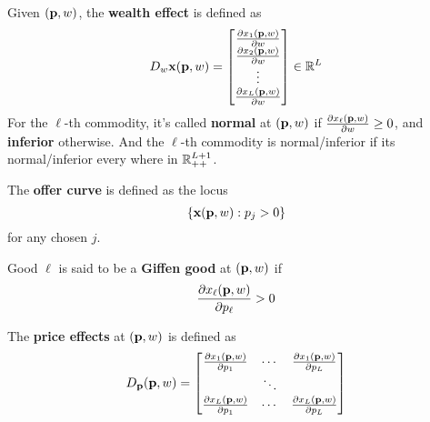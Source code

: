 \documentclass{article}
\begin{document}
 			\begin{definition}
 				Given $(\textbf{p}, w)$, the \textbf{wealth effect} is defined as
 				\begin{equation}
 					D_w \textbf{x}(\textbf{p}, w) 
 					= \begin{bmatrix}
 						\frac{\partial{x_1(\textbf{p}, w)}}{\partial{w}} \\
 						\frac{\partial{x_2(\textbf{p}, w)}}{\partial{w}} \\
 						\vdots \\
 						\frac{\partial{x_L(\textbf{p}, w)}}{\partial{w}}
 					\end{bmatrix} \in \mathbb{R}^L
 				\end{equation}
 				For the $\ell$-th commodity, it's called \textbf{normal} at $(\textbf{p}, w)$ if $\frac{\partial{x_{\ell}(\textbf{p}, w)}}{\partial{w}} \geq 0$, and \textbf{inferior} otherwise. And the $\ell$-th commodity is normal/inferior if its normal/inferior every where in $\mathbb{R}_{++}^{L+1}$. 
 			\end{definition}
 			
 			\begin{definition}
 				The \textbf{offer curve} is defined as the locus
 				\begin{equation}
 					\{\textbf{x}(\textbf{p}, w): p_j > 0\}
 				\end{equation}
 				for any chosen $j$.
 			\end{definition}
 			
 			\begin{definition}
 				Good $\ell$ is said to be a \textbf{Giffen good} at $(\textbf{p}, w)$ if
 				\begin{equation}
 					\frac{\partial{x_\ell(\textbf{p}, w)}}{\partial{p_\ell}} > 0
 				\end{equation}
 			\end{definition}
 			
 			\begin{definition}
 				The \textbf{price effects} at $(\textbf{p}, w)$ is defined as
 				\begin{equation}
 					D_{\textbf{p}} (\textbf{p}, w) = 
 					\begin{bmatrix}
 						\frac{\partial{x_1(\textbf{p}, w)}}{\partial{p_1}} & \cdots & \frac{\partial{x_1(\textbf{p}, w)}}{\partial{p_L}} \\
 						& \ddots & \\
 						\frac{\partial{x_L(\textbf{p}, w)}}{\partial{p_1}} & \cdots & \frac{\partial{x_L(\textbf{p}, w)}}{\partial{p_L}}
 					\end{bmatrix}
 				\end{equation}
 			\end{definition}
 			
\end{document}
